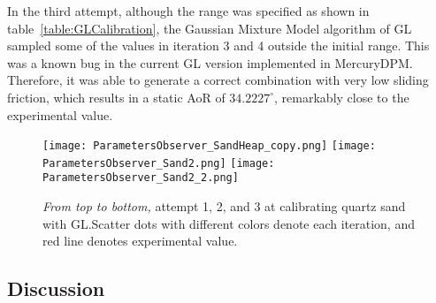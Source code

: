 In the third attempt, although the range was specified as shown in table~\ref{table:GLCalibration}, the Gaussian Mixture Model algorithm of GL sampled some of the values in iteration 3 and 4 outside the initial range. This was a known bug in the current GL version implemented in MercuryDPM. Therefore, it was able to generate a correct combination with very low sliding friction, which results in a static AoR of $34.2227^{\circ}$, remarkably close to the experimental value. 


\begin{figure}[H]
    \centering
    \texttt{[image: ParametersObserver\_SandHeap\_copy.png]}
    \texttt{[image: ParametersObserver\_Sand2.png]}
    \texttt{[image: ParametersObserver\_Sand2\_2.png]}
    \caption{\textit{From top to bottom,} attempt 1, 2, and 3 at calibrating quartz sand with GL.\@ Scatter dots with different colors denote each iteration, and red line denotes experimental value.}\label{fig:QuartzGL}
\end{figure}

\begin{table}[H]
    \centering
    \caption{Calibration results of sand with GL.}\label{table:resSandGL}
\end{table}

\subsection{Discussion} 
 
